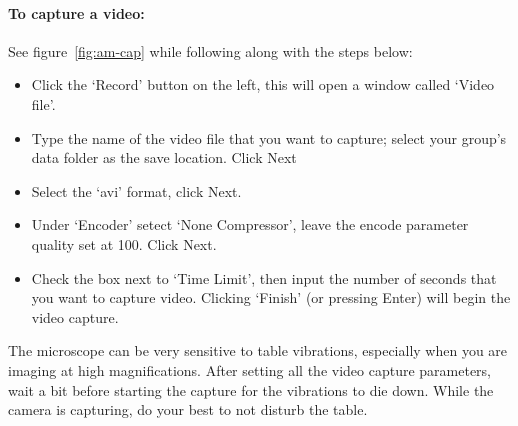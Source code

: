 \paragraph*{To capture a video:}
See figure~\ref{fig:am-cap} while following along with the steps below:
\begin{itemize}
\item Click the `Record' button on the left, this will open a window called `Video file'.
\item Type the name of the video file that you want to capture; select your group's data folder as the save location. Click Next
\item Select the `avi' format, click Next.
\item Under `Encoder' setect `None Compressor', leave the encode parameter quality set at 100. Click Next.
\item Check the box next to `Time Limit', then input the number of seconds that you want to capture video. Clicking `Finish' (or pressing Enter) will begin the video capture.
\end{itemize}
The microscope can be very sensitive to table vibrations, especially when you are imaging at high magnifications. 
After setting all the video capture parameters, wait a bit before starting the capture for the vibrations to die down.
While the camera is capturing, do your best to not disturb the table.

